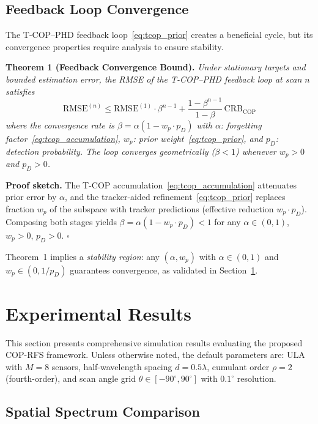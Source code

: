 \documentclass[journal]{IEEEtran}
\begin{document}
\subsection{Feedback Loop Convergence}
\label{sec:convergence}

The T-COP--PHD feedback loop~\eqref{eq:tcop_prior} creates a beneficial cycle, but its convergence properties require analysis to ensure stability.

\textbf{Theorem 1 (Feedback Convergence Bound).}
\emph{Under stationary targets and bounded estimation error, the RMSE of the T-COP--PHD feedback loop at scan $n$ satisfies}
\begin{equation}
\mathrm{RMSE}^{(n)} \leq \mathrm{RMSE}^{(1)} \cdot \beta^{n-1} + \frac{1-\beta^{n-1}}{1-\beta}\,\mathrm{CRB}_{\mathrm{COP}}
\label{eq:convergence_bound}
\end{equation}
\emph{where the convergence rate is $\beta = \alpha(1 - w_p \cdot p_D)$ with $\alpha$: forgetting factor~\eqref{eq:tcop_accumulation}, $w_p$: prior weight~\eqref{eq:tcop_prior}, and $p_D$: detection probability. The loop converges geometrically ($\beta < 1$) whenever $w_p > 0$ and $p_D > 0$.}

\textbf{Proof sketch.}
The T-COP accumulation~\eqref{eq:tcop_accumulation} attenuates prior error by $\alpha$, and the tracker-aided refinement~\eqref{eq:tcop_prior} replaces fraction $w_p$ of the subspace with tracker predictions (effective reduction $w_p \cdot p_D$). Composing both stages yields $\beta = \alpha(1 - w_p \cdot p_D) < 1$ for any $\alpha \in (0,1)$, $w_p > 0$, $p_D > 0$. \hfill$\square$

Theorem~1 implies a \emph{stability region}: any $(\alpha, w_p)$ with $\alpha \in (0,1)$ and $w_p \in (0, 1/p_D)$ guarantees convergence, as validated in Section~\ref{sec:experiments}.

\section{Experimental Results}
\label{sec:experiments}

This section presents comprehensive simulation results evaluating the proposed COP-RFS framework. Unless otherwise noted, the default parameters are: ULA with $M = 8$ sensors, half-wavelength spacing $d = 0.5\lambda$, cumulant order $\rho = 2$ (fourth-order), and scan angle grid $\theta \in [-90^\circ, 90^\circ]$ with $0.1^\circ$ resolution.

\subsection{Spatial Spectrum Comparison}
\end{document}
